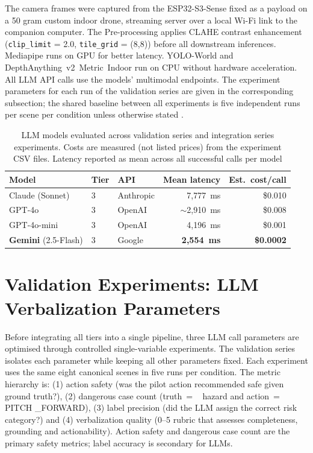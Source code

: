 The camera frames were captured from the ESP32-S3-Sense fixed as a payload on a 50 gram custom indoor drone, streaming server over a local Wi-Fi link to the companion computer.
The Pre-processing applies CLAHE contrast enhancement \cite{clahe_zuiderveld1994} (\texttt{clip\_limit} = 2.0, \texttt{tile\_grid} = (8,8)) before all downstream inferences.
Mediapipe runs on GPU for better latency.
YOLO-World and DepthAnything~v2~Metric~Indoor run on CPU without
hardware acceleration. 
All LLM API calls use the models' multimodal endpoints.
The experiment parameters for each run of the validation series are given in the corresponding subsection; the shared baseline between all experiments is five independent runs per scene per condition unless otherwise stated \cite{liang2023helm}.

\begin{table}[ht]
  \caption{LLM models evaluated across validation series and integration series experiments.
  Costs are measured (not listed prices) from the experiment CSV files.
  Latency reported as mean across all successful calls per model}
  \label{tab:ch2_models}
  \centering
  \small
  \begin{tabular}{lllrr}
    \toprule
    Model & Tier & API & Mean latency & Est.\ cost/call \\
    \midrule
    Claude (Sonnet)   & 3 & Anthropic & 7,777~ms & \$0.010 \\
    GPT-4o            & 3 & OpenAI    & $\sim$2,910~ms & \$0.008 \\
    GPT-4o-mini       & 3 & OpenAI    & 4,196~ms & \$0.001 \\
    \textbf{Gemini} (2.5-Flash)  & 3 & Google  & \textbf{2,554~ms} & \textbf{\$0.0002} \\
    \bottomrule
  \end{tabular}
\end{table}


\section{Validation Experiments: LLM Verbalization Parameters}
\label{sec:ch2_validation}

Before integrating all tiers into a single pipeline, three LLM call parameters are optimised through controlled single-variable experiments. 
The validation series isolates each parameter while keeping all other parameters fixed. 
Each experiment uses the same eight canonical scenes in five runs per condition. 
The metric hierarchy is: (1) action safety (was the pilot action recommended safe given ground truth?), (2) dangerous case count (truth~= ~ hazard and action~= ~ PITCH \_FORWARD), (3) label precision (did the LLM assign the correct risk category?) and
(4) verbalization quality (0--5 rubric that assesses completeness, grounding and actionability). 
Action safety and dangerous case count are the primary safety metrics; label accuracy is secondary for LLMs.

